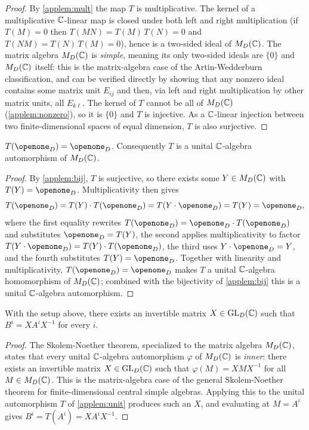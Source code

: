 \begin{proof}
    By \cref{applem:mult} the map $T$ is multiplicative. The kernel of a multiplicative $\mathbb{C}$-linear map is closed under both left and right multiplication (if $T(M) = 0$ then $T(MN) = T(M)\,T(N) = 0$ and $T(NM) = T(N)\,T(M) = 0$), hence is a two-sided ideal of $M_D(\mathbb{C})$. The matrix algebra $M_D(\mathbb{C})$ is \emph{simple}, meaning its only two-sided ideals are $\{0\}$ and $M_D(\mathbb{C})$ itself: this is the matrix-algebra case of the Artin-Wedderburn classification, and can be verified directly by showing that any nonzero ideal contains some matrix unit $E_{ij}$ and then, via left and right multiplication by other matrix units, all $E_{k\ell}$. The kernel of $T$ cannot be all of $M_D(\mathbb{C})$ (\cref{applem:nonzero}), so it is $\{0\}$ and $T$ is injective. As a $\mathbb{C}$-linear injection between two finite-dimensional spaces of equal dimension, $T$ is also surjective.
\end{proof}

\begin{applem}[Unitality]\label{applem:unit}
    $T(\openone_D) = \openone_D$. Consequently $T$ is a unital $\mathbb{C}$-algebra automorphism of $M_D(\mathbb{C})$.
\end{applem}

\begin{proof}
    By \cref{applem:bij}, $T$ is surjective, so there exists some $Y \in M_D(\mathbb{C})$ with $T(Y) = \openone_D$. Multiplicativity then gives
    \[
        T(\openone_D) =  T(Y) \cdot T(\openone_D) =  T(Y \cdot \openone_D) =  T(Y) =  \openone_D,
    \]
    where the first equality rewrites $T(\openone_D) = \openone_D \cdot T(\openone_D)$ and substitutes $\openone_D = T(Y)$, the second applies multiplicativity to factor $T(Y \cdot \openone_D) = T(Y) \cdot T(\openone_D)$, the third uses $Y \cdot \openone_D = Y$, and the fourth substitutes $T(Y) = \openone_D$. Together with linearity and multiplicativity, $T(\openone_D) = \openone_D$ makes $T$ a unital $\mathbb{C}$-algebra homomorphism of $M_D(\mathbb{C})$; combined with the bijectivity of \cref{applem:bij} this is a unital $\mathbb{C}$-algebra automorphism.
\end{proof}

\begin{appthm}\label{appthm:ftsb}
    With the setup above, there exists an invertible matrix $X \in \mathrm{GL}_D(\mathbb{C})$ such that $B^i = X A^i X^{-1}$ for every $i$.
\end{appthm}

\begin{proof}
    The Skolem-Noether theorem, specialized to the matrix algebra $M_D(\mathbb{C})$, states that every unital $\mathbb{C}$-algebra automorphism $\varphi$ of $M_D(\mathbb{C})$ is \emph{inner}: there exists an invertible matrix $X \in \mathrm{GL}_D(\mathbb{C})$ such that $\varphi(M) = X M X^{-1}$ for all $M \in M_D(\mathbb{C})$. This is the matrix-algebra case of the general Skolem-Noether theorem for finite-dimensional central simple algebras. Applying this to the unital automorphism $T$ of \cref{applem:unit} produces such an $X$, and evaluating at $M = A^i$ gives $B^i = T(A^i) = X A^i X^{-1}$.
\end{proof}

